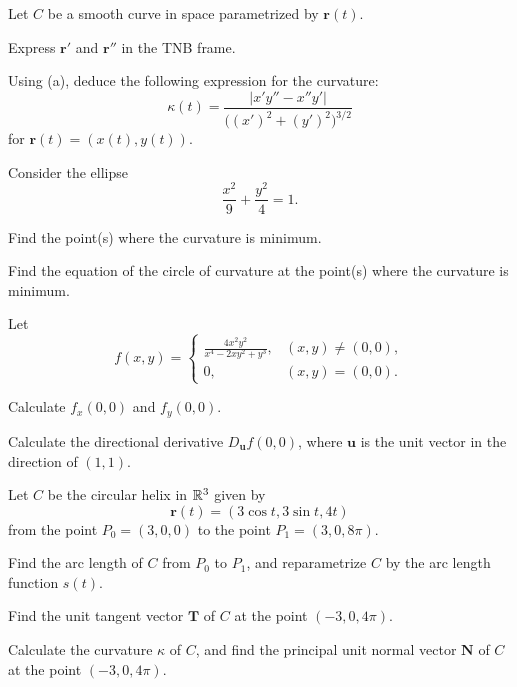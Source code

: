 \begin{problem}
Let $C$ be a smooth curve in space parametrized by $\mathbf r(t)$.
\begin{problemsubparts}
\item Express $\mathbf r'$ and $\mathbf r''$ in the TNB frame.
\item Using (a), deduce the following expression for the curvature:
\[
\kappa(t)=
\frac{|x'y''-x''y'|}{\bigl((x')^2+(y')^2\bigr)^{3/2}}
\]
for $\mathbf r(t)=(x(t),y(t))$.
\end{problemsubparts}
\end{problem}

\begin{problem}
Consider the ellipse
\[
\frac{x^2}{9}+\frac{y^2}{4}=1.
\]
\begin{problemsubparts}
\item Find the point(s) where the curvature is minimum.
\item Find the equation of the circle of curvature at the point(s) where the curvature is minimum.
\end{problemsubparts}
\end{problem}

\begin{problem}
Let
\[
f(x,y)=
\begin{cases}
\displaystyle\frac{4x^2y^2}{x^4-2xy^2+y^3}, & (x,y)\ne(0,0),\\[0.6em]
0, & (x,y)=(0,0).
\end{cases}
\]
\begin{problemsubparts}
\item Calculate $f_x(0,0)$ and $f_y(0,0)$.
\item Calculate the directional derivative $D_{\mathbf u}f(0,0)$, where $\mathbf u$ is the unit vector in the direction of $(1,1)$.
\end{problemsubparts}
\end{problem}

\begin{problem}
Let $C$ be the circular helix in $\mathbb{R}^3$ given by
\[
\mathbf r(t)=(3\cos t,3\sin t,4t)
\]
from the point $P_0=(3,0,0)$ to the point $P_1=(3,0,8\pi)$.
\begin{problemsubparts}
\item Find the arc length of $C$ from $P_0$ to $P_1$, and reparametrize $C$ by the arc length function $s(t)$.
\item Find the unit tangent vector $\mathbf T$ of $C$ at the point $(-3,0,4\pi)$.
\item Calculate the curvature $\kappa$ of $C$, and find the principal unit normal vector $\mathbf N$ of $C$ at the point $(-3,0,4\pi)$.
\end{problemsubparts}
\end{problem}

